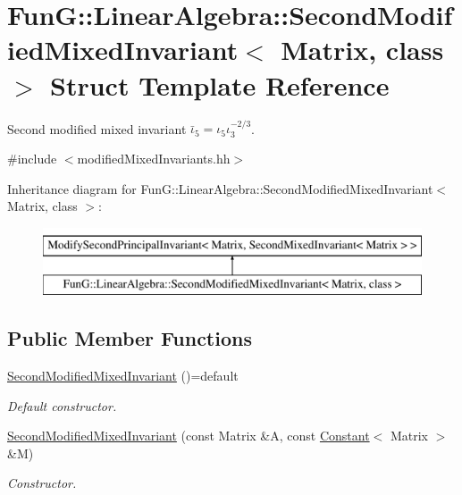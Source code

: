 \hypertarget{structFunG_1_1LinearAlgebra_1_1SecondModifiedMixedInvariant}{\section{Fun\-G\-:\-:Linear\-Algebra\-:\-:Second\-Modified\-Mixed\-Invariant$<$ Matrix, class $>$ Struct Template Reference}
\label{structFunG_1_1LinearAlgebra_1_1SecondModifiedMixedInvariant}
}


Second modified mixed invariant $\bar\iota_5=\iota_5\iota_3^{-2/3}$.  




{\ttfamily \#include $<$modified\-Mixed\-Invariants.\-hh$>$}

Inheritance diagram for Fun\-G\-:\-:Linear\-Algebra\-:\-:Second\-Modified\-Mixed\-Invariant$<$ Matrix, class $>$\-:\begin{figure}[H]
\begin{center}
\leavevmode
\includegraphics[height=2.000000cm]{structFunG_1_1LinearAlgebra_1_1SecondModifiedMixedInvariant}
\end{center}
\end{figure}
\subsection*{Public Member Functions}
\begin{DoxyCompactItemize}
\item 
\hypertarget{structFunG_1_1LinearAlgebra_1_1SecondModifiedMixedInvariant_a7ab36c0b69e16205a6aadcd61d8bed61}{\hyperlink{structFunG_1_1LinearAlgebra_1_1SecondModifiedMixedInvariant_a7ab36c0b69e16205a6aadcd61d8bed61}{Second\-Modified\-Mixed\-Invariant} ()=default}\label{structFunG_1_1LinearAlgebra_1_1SecondModifiedMixedInvariant_a7ab36c0b69e16205a6aadcd61d8bed61}

\begin{DoxyCompactList}\small\item\em Default constructor. \end{DoxyCompactList}\item 
\hyperlink{structFunG_1_1LinearAlgebra_1_1SecondModifiedMixedInvariant_a14b48ec7960d8c42d2bf8c1258e20fce}{Second\-Modified\-Mixed\-Invariant} (const Matrix \&A, const \hyperlink{structFunG_1_1Constant}{Constant}$<$ Matrix $>$ \&M)
\begin{DoxyCompactList}\small\item\em Constructor. \end{DoxyCompactList}\end{DoxyCompactItemize}



